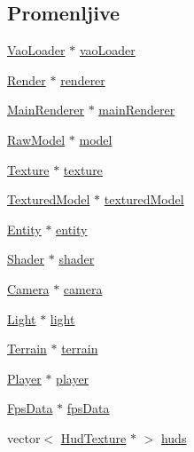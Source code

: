 \subsection*{Promenljive}
\begin{DoxyCompactItemize}
\item 
\hyperlink{classcore_1_1VaoLoader}{Vao\+Loader} $\ast$ \hyperlink{namespacecore_a78dd24784c415d3759a0f71b8f4f9f81}{vao\+Loader}
\item 
\hyperlink{classcore_1_1Render}{Render} $\ast$ \hyperlink{namespacecore_a4f2740ccbefd3bb34c624a8c99d6446d}{renderer}
\item 
\hyperlink{classcore_1_1MainRenderer}{Main\+Renderer} $\ast$ \hyperlink{namespacecore_a01adfda2bbace85dc243e5fba0d93b52}{main\+Renderer}
\item 
\hyperlink{classmodel_1_1RawModel}{Raw\+Model} $\ast$ \hyperlink{namespacecore_aa1479d4ed4dadbfe085b26662122b68a}{model}
\item 
\hyperlink{classtexture_1_1Texture}{Texture} $\ast$ \hyperlink{namespacecore_ab1e87a88eb2e893aa68d0d791ac9859c}{texture}
\item 
\hyperlink{classmodel_1_1TexturedModel}{Textured\+Model} $\ast$ \hyperlink{namespacecore_ad4d5c25548862489d6a237342748ad74}{textured\+Model}
\item 
\hyperlink{classentity_1_1Entity}{Entity} $\ast$ \hyperlink{namespacecore_aa710c0ea388433d2d80d1d1c67582eda}{entity}
\item 
\hyperlink{classshader_1_1Shader}{Shader} $\ast$ \hyperlink{namespacecore_adf2f7f5f951bd01b06d6c792d7bf301b}{shader}
\item 
\hyperlink{classentity_1_1Camera}{Camera} $\ast$ \hyperlink{namespacecore_a9d645c490b142886301256f6cf9c65c2}{camera}
\item 
\hyperlink{classentity_1_1Light}{Light} $\ast$ \hyperlink{namespacecore_a2324d96000e7c6d42570a0577e8f070b}{light}
\item 
\hyperlink{classterrain_1_1Terrain}{Terrain} $\ast$ \hyperlink{namespacecore_ac45da6f80dac9bead5c9310c27897f15}{terrain}
\item 
\hyperlink{classentity_1_1Player}{Player} $\ast$ \hyperlink{namespacecore_a8130d7cf3bb04bc517651bc3855f8c0f}{player}
\item 
\hyperlink{classutility_1_1FpsData}{Fps\+Data} $\ast$ \hyperlink{namespacecore_a5d5106eb67b679c9260ebe0a9faf14db}{fps\+Data}
\item 
vector$<$ \hyperlink{classhud_1_1HudTexture}{Hud\+Texture} $\ast$ $>$ \hyperlink{namespacecore_ad6858d3a6f10dffc125d162eab364996}{huds}

\end{DoxyCompactItemize}
